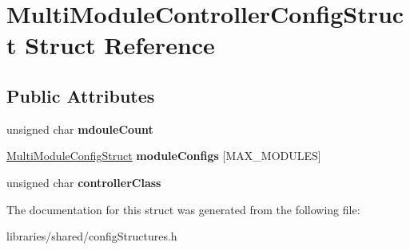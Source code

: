 \hypertarget{struct_multi_module_controller_config_struct}{}\section{Multi\+Module\+Controller\+Config\+Struct Struct Reference}
\label{struct_multi_module_controller_config_struct}
\subsection*{Public Attributes}
\begin{DoxyCompactItemize}
\item 
\mbox{\label{struct_multi_module_controller_config_struct_a34dfb8c49e8e80c63772fc0439a8d402}} 
unsigned char {\bfseries mdoule\+Count}
\item 
\mbox{\label{struct_multi_module_controller_config_struct_a8efee81c7911a6c6e85d0dbf2dc418aa}} 
\hyperlink{struct_multi_module_config_struct}{Multi\+Module\+Config\+Struct} {\bfseries module\+Configs} \mbox{[}M\+A\+X\+\_\+\+M\+O\+D\+U\+L\+ES\mbox{]}
\item 
\mbox{\label{struct_multi_module_controller_config_struct_a143e12c476ba98a012b3728826fa9f9a}} 
unsigned char {\bfseries controller\+Class}
\end{DoxyCompactItemize}


The documentation for this struct was generated from the following file\+:\begin{DoxyCompactItemize}
\item 
libraries/shared/config\+Structures.\+h\end{DoxyCompactItemize}
